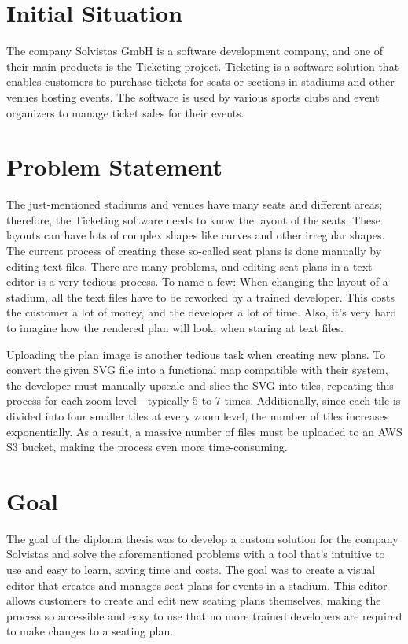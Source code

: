 \section{Initial Situation}
The company Solvistas GmbH is a software development company, and one of their main products is the Ticketing project. Ticketing is a software solution that enables customers to purchase tickets for seats or sections in stadiums and other venues hosting events. The software is used by various sports clubs and event organizers to manage ticket sales for their events.


\section{Problem Statement}
The just-mentioned stadiums and venues have many seats and different areas; therefore, the Ticketing software needs to know the layout of the seats. These layouts can have lots of complex shapes like curves and other irregular shapes. The current process of creating these so-called seat plans is done manually by editing text files. There are many problems, and editing seat plans in a text editor is a very tedious process. To name a few: When changing the layout of a stadium, all the text files have to be reworked by a trained developer. This costs the customer a lot of money, and the developer a lot of time. Also, it's very hard to imagine how the rendered plan will look, when staring at text files.

Uploading the plan image is another tedious task when creating new plans. To convert the given SVG file into a functional map compatible with their system, the developer must manually upscale and slice the SVG into tiles, repeating this process for each zoom level—typically 5 to 7 times. Additionally, since each tile is divided into four smaller tiles at every zoom level, the number of tiles increases exponentially. As a result, a massive number of files must be uploaded to an AWS S3 bucket, making the process even more time-consuming.

\section{Goal}
The goal of the diploma thesis was to develop a custom solution for the company Solvistas and solve the aforementioned problems with a tool that's intuitive to use and easy to learn, saving time and costs. The goal was to create a visual editor that creates and manages seat plans for events in a stadium. This editor allows customers to create and edit new seating plans themselves, making the process so accessible and easy to use that no more trained developers are required to make changes to a seating plan.